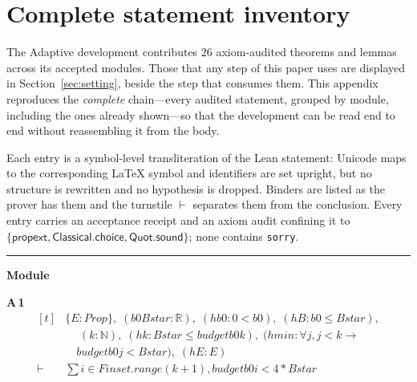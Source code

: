 \appendices
\section{Complete statement inventory}
\label{app:inventory}

The Adaptive development contributes $26$ axiom-audited theorems and lemmas across its accepted modules. Those that any step of this paper uses are displayed in Section~\ref{sec:setting}, beside the step that consumes them. This appendix reproduces the \emph{complete} chain---every audited statement, grouped by module, including the ones already shown---so that the development can be read end to end without reassembling it from the body.

Each entry is a symbol-level transliteration of the Lean statement: Unicode maps to the corresponding \LaTeX{} symbol and identifiers are set upright, but no structure is rewritten and no hypothesis is dropped. Binders are listed as the prover has them and the turnstile $\vdash$ separates them from the conclusion. Every entry carries an acceptance receipt and an axiom audit confining it to $\{\textsf{propext},\textsf{Classical.choice},\textsf{Quot.sound}\}$; none contains \texttt{sorry}.

\vspace{4pt}\noindent\rule{\columnwidth}{0.4pt}\par\vspace{2pt}
\noindent\textbf{Module }\par\vspace{3pt}

\noindent\textbf{A\,1}\quad{}
{\footnotesize\[ \begin{aligned}[t]
&\{ \mathit{E} : \mathit{Prop}\},\; (\mathit{b0} \mathit{Bstar} : \mathbb{R} ),\; (\mathit{hb0} : 0 < \mathit{b0}),\; (\mathit{hB} : \mathit{b0} \leq \mathit{Bstar}),\\
&\quad \; (\mathit{k} : \mathbb{N} ),\; (\mathit{hk} : \mathit{Bstar} \leq \mathit{budget} \mathit{b0} \mathit{k}),\; (\mathit{hmin} : \forall \mathit{j}, \mathit{j} < \mathit{k} \to\\
&\quad \mathit{budget} \mathit{b0} \mathit{j} < \mathit{Bstar}),\; (\mathit{hE} : \mathit{E})\\
\vdash\;&\textstyle\sum \mathit{i} \in \mathit{Finset}.\mathit{range} (\mathit{k} + 1), \mathit{budget} \mathit{b0} \mathit{i} < 4 * \mathit{Bstar}
\end{aligned} \]}

